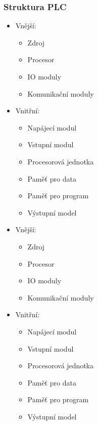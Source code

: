 \subsubsection*{Struktura PLC}
\begin{itemize}
  \item Vnější: \begin{itemize}
    \item Zdroj
    \item Procesor 
    \item IO moduly 
    \item Komunikační moduly
  \end{itemize}
  \item Vnitřní: \begin{itemize}
    \item Napájecí modul
    \item Vstupní modul
    \item Procesorová jednotka
    \item Paměť pro data
    \item Paměť pro program
    \item Výstupní model
  \end{itemize}
    \item Vnější: \begin{itemize}
              \item Zdroj
              \item Procesor
              \item IO moduly
              \item Komunikační moduly
          \end{itemize}
    \item Vnitřní: \begin{itemize}
              \item Napájecí modul
              \item Vstupní modul
              \item Procesorová jednotka
              \item Paměť pro data
              \item Paměť pro program
              \item Výstupní model
          \end{itemize}
\end{itemize}

